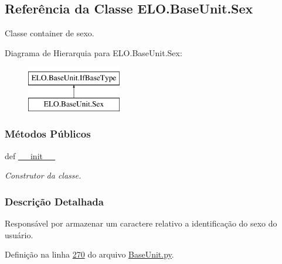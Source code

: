 \hypertarget{classELO_1_1BaseUnit_1_1Sex}{\subsection{Referência da Classe E\-L\-O.\-Base\-Unit.\-Sex}
\label{classELO_1_1BaseUnit_1_1Sex}
}


Classe container de sexo.  


Diagrama de Hierarquia para E\-L\-O.\-Base\-Unit.\-Sex\-:\begin{figure}[H]
\begin{center}
\leavevmode
\includegraphics[height=2.000000cm]{dd/d8a/classELO_1_1BaseUnit_1_1Sex}
\end{center}
\end{figure}
\subsubsection*{Métodos Públicos}
\begin{DoxyCompactItemize}
\item 
def \hyperlink{classELO_1_1BaseUnit_1_1Sex_a2a5214adaf2a657f70cd8cf579e420b5}{\-\_\-\-\_\-init\-\_\-\-\_\-}
\begin{DoxyCompactList}\small\item\em Construtor da classe. \end{DoxyCompactList}\end{DoxyCompactItemize}


\subsubsection{Descrição Detalhada}
Responsável por armazenar um caractere relativo a identificação do sexo do usuário. 

Definição na linha \hyperlink{BaseUnit_8py_source_l00270}{270} do arquivo \hyperlink{BaseUnit_8py_source}{Base\-Unit.\-py}.



